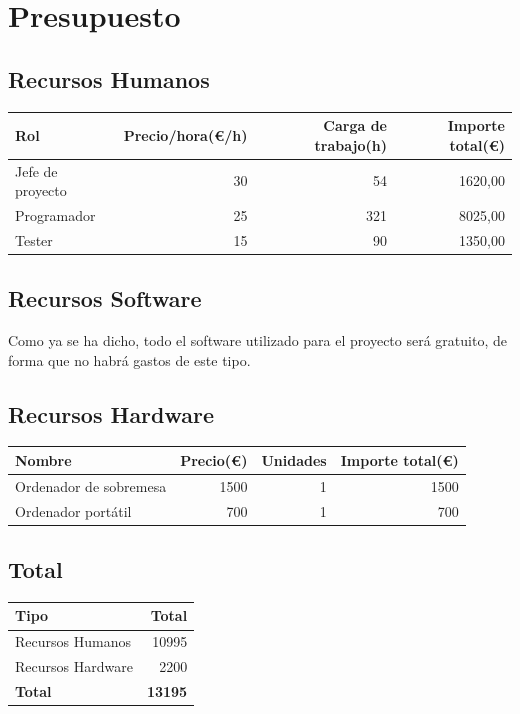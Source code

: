 \chapter{Presupuesto}

\section{Recursos Humanos}

\begin{center}
	\begin{tabular}{| l | r | r | r |}
		\hline
		Rol					&	Precio/hora(\euro/h)	&	Carga de trabajo(h)	&	Importe total(\euro)	\\	\hline
		Jefe de proyecto	& 	30						&	54 					& 	1620,00				\\	\hline
		Programador			&	25						&	321					&	8025,00			\\	\hline
		Tester			&	15						&	90					&	1350,00				\\	\hline
	\end{tabular}
\end{center}

\section{Recursos Software}

Como ya se ha dicho, todo el software utilizado para el proyecto será gratuito, de forma que no habrá gastos de este tipo.

\section{Recursos Hardware}

\begin{center}
	\begin{tabular}{| l | r | r | r |}
		\hline
		Nombre				&	Precio(\euro)	&	Unidades	&	Importe total(\euro)	\\	\hline
		Ordenador de sobremesa			& 	1500			&	1 			&	1500					\\	\hline
		Ordenador portátil	&	700				&	1			&	700						\\
		\hline
	\end{tabular}
\end{center}

\section{Total}

\begin{center}
	\begin{tabular}{| l | r |}
		\hline
		Tipo				&	Total			\\	\hline
		Recursos Humanos	& 	10995		\\	\hline
		Recursos Hardware	&	2200		\\	\hline
		\textbf{Total}		&	\textbf{13195}	\\
		\hline
	\end{tabular}
\end{center}